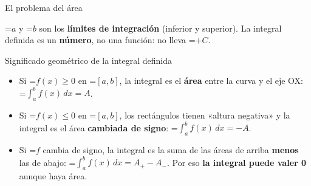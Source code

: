 \documentclass[11pt,a4paper]{article}
\newcommand{\fmm}[1]{\setbox0=\hbox{$#1$}\ifdim\wd0>\linewidth\[#1\]\else\mbox{\box0}\fi}
\begin{document}
\begin{fmdef}{El problema del área}
      
\begin{fmnote}\fmm{a} y \fmm{b} son los \textbf{límites de integración} (inferior y superior). La integral definida es un \textbf{número}, no una función: no lleva \fmm{+C}.\end{fmnote}
\end{fmdef}

  
\begin{fmprop}{Significado geométrico de la integral definida}
\par\noindent \begin{minipage}[t]{0.48\linewidth}\vspace{0pt}\raggedright \begin{itemize}
\item Si \fmm{f(x)\geq0} en \fmm{[a,b]}, la integral es el \textbf{área} entre la curva y el eje OX: \fmm{\displaystyle\int_a^b f(x)\,dx=A}.
\item Si \fmm{f(x)\leq0} en \fmm{[a,b]}, los rectángulos tienen «altura negativa» y la integral es el área \textbf{cambiada de signo}: \fmm{\displaystyle\int_a^b f(x)\,dx=-A}.
\item Si \fmm{f} cambia de signo, la integral es la suma de las áreas de arriba \textbf{menos} las de abajo: \fmm{\displaystyle\int_a^b f(x)\,dx=A_{+}-A_{-}}. Por eso \textbf{la integral puede valer 0} aunque haya área.

\end{itemize}
\end{minipage}
\end{fmprop}
\end{document}
